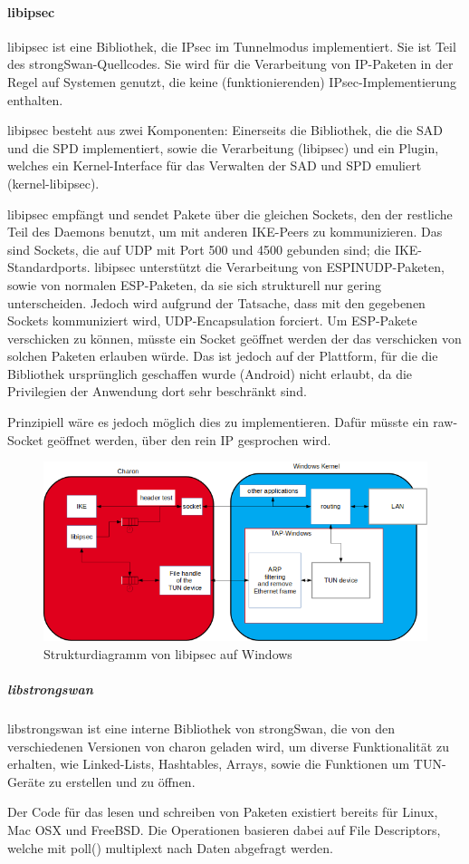 \paragraph{libipsec}
libipsec ist eine Bibliothek, die IPsec im Tunnelmodus implementiert.
Sie ist Teil des strongSwan-Quellcodes. Sie wird für die Verarbeitung von IP-Paketen
in der Regel auf Systemen genutzt, die keine (funktionierenden) IPsec-Implementierung
enthalten.

libipsec besteht aus zwei Komponenten: Einerseits die Bibliothek, die die SAD und die SPD
implementiert, sowie die Verarbeitung (libipsec) und ein Plugin, welches ein Kernel-Interface
für das Verwalten der \ac{SAD} und \ac{SPD} emuliert (kernel-libipsec).

libipsec empfängt und sendet Pakete über die gleichen Sockets, den der restliche Teil
des Daemons benutzt, um mit anderen IKE-Peers zu kommunizieren. Das sind Sockets,
die auf UDP mit Port 500 und 4500 gebunden sind; die IKE-Standardports.
libipsec unterstützt die Verarbeitung von ESPINUDP-Paketen, sowie von normalen ESP-Paketen,
da sie sich strukturell nur gering unterscheiden. Jedoch wird aufgrund der Tatsache,
dass mit den gegebenen Sockets kommuniziert wird, UDP-Encapsulation forciert.
Um ESP-Pakete verschicken zu können, müsste ein Socket geöffnet werden der das
verschicken von solchen Paketen erlauben würde. Das ist jedoch auf der Plattform,
für die die Bibliothek ursprünglich geschaffen wurde (Android) nicht erlaubt, da
die Privilegien der Anwendung dort sehr beschränkt sind.

Prinzipiell wäre es jedoch möglich dies zu implementieren. Dafür müsste ein
raw-Socket geöffnet werden, über den rein IP gesprochen wird.
\begin{figure}
\centering
%
%
\includegraphics[width=\textwidth]{Diagram.png}
\caption{Strukturdiagramm von libipsec auf Windows }
\end{figure}

\subparagraph{libstrongswan}
libstrongswan ist eine interne Bibliothek von strongSwan, die von den verschiedenen
Versionen von charon geladen wird, um diverse Funktionalität zu erhalten, wie
Linked-Lists, Hashtables, Arrays, sowie die Funktionen um TUN-Geräte zu erstellen und zu öffnen.

Der Code für das lesen und schreiben von Paketen existiert bereits für Linux, Mac OSX
und FreeBSD.
Die Operationen basieren dabei auf File Descriptors, welche mit poll() multiplext nach
Daten abgefragt werden.
